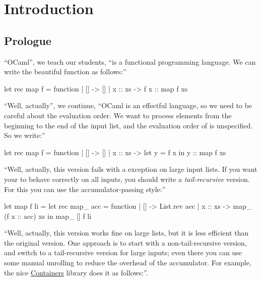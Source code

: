\section{Introduction}

\subsection{Prologue}

``OCaml'', we teach our students, ``is a functional programming language. We can write the beautiful function  as follows:''
\begin{Ocaml}
let rec map f = function
| [] -> []
| x :: xs -> f x :: map f xs
\end{Ocaml}

``Well, actually'', we continue, ``OCaml is an effectful language, so we need to be careful about the evaluation order. We want  to process elements from the beginning to the end of the input list, and the evaluation order of  is unspecified. So we write:''
\begin{Ocaml}
let rec map f = function
| [] -> []
| x :: xs ->
  let y = f x in
  y :: map f xs
\end{Ocaml}

``Well, actually, this version fails with a 
exception on large input lists. If you want your  to behave
correctly on all inputs, you should write a \emph{tail-recursive}
version. For this you can use the accumulator-passing style:''
\begin{Ocaml}
let map f li =
  let rec map_ acc = function
  | [] -> List.rev acc
  | x :: xs -> map_ (f x :: acc) xs
  in map_ [] f li
\end{Ocaml}

``Well, actually, this version works fine on large lists, but it is
less efficient than the original version. One approach is to start with
a non-tail-recursive version, and switch to a tail-recursive version
for large inputs; even there you can use some manual unrolling to
reduce the overhead of the accumulator. For example, the nice
\href{https://github.com/c-cube/ocaml-containers}{Containers} library
does it as follows:''.


